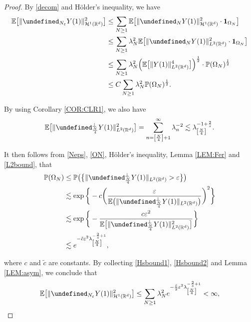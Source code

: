 \documentclass[%
11pt,  reqno]{amsart}
\theoremstyle{remarkstyle}
\newcommand{\1}{\hspace{0.2mm}\text{I}\hspace{0.2mm}}
\newcommand{\noi}{\noindent}
\newcommand{\R}{\mathbb{R}}
\let\P= \undefined
\newcommand{\P}{\mathbf{P}}
\newcommand{\E}{\mathbb{E}}
\newcommand{\eps}{\varepsilon}
\newcommand{\ld}{\lambda}
\renewcommand{\O}{\Omega}
\newcommand{\les}{\lesssim}
\newcommand{\ges}{\gtrsim}
\newcommand{\ind}{\mathbf 1}
\renewcommand{\H}{\mathcal{H}}
\newcommand{\PP}{\mathbb{P}}
\numberwithin{equation}{section}
\numberwithin{theorem}{section}
\begin{document}
\begin{proof}
		\noi
		By \eqref{decom} and H\"older's  inequality, 
		we have
		\begin{align}
			\label{Hsbound1}
			\begin{split}
				\E \big[ \| \P_{N_\eps} Y(1)\|_{\H^1 (\R^d)}^2 \big]  
				& \le \sum_{N\ge 1} \E  \big[ \| \P_{N} Y(1)\|_{\H^1 (\R^d)}^2 \cdot \ind_{\O_N} \big] \\
				& \le \sum_{N\ge 1} \ld_N^{2} \E \big[ \| \P_{ N} Y(1)\|_{L^2 (\R^d)}^2 \cdot \ind_{\O_N} \big]\\
				& \le \sum_{N\ge 1} \ld_N^{2} \Big( \E \big[ \| Y(1)\|_{L^2 (\R^d)}^4 \big] \Big)^{\frac12} \cdot \PP({\O_N})^{\frac12}
				\\
				& \le C \sum_{N\ge 1} \ld_N^{2}  \PP({\O_N})^{\frac12}.
			\end{split}
		\end{align}
		
		\noi
		By using Corollary \ref{COR:CLR1}, 
		we also  have 
		\begin{align}
			\label{L2bound}
			\E \big[ \| \P^\perp_{\frac{N}4} Y(1) \|_{L^2 (\R^d)}^2  \big] = \sum_{n = \left[\frac{N}4\right]+1}^\infty \ld_n^{-2} \les \ld_{\left[\frac{N}4\right]}^{-1 + \frac2s}.
		\end{align}
		
		\noi
		It then follows from \eqref{Neps}, \eqref{ON},
		H\"older's  inequality, Lemma \ref{LEM:Fer}
		and \eqref{L2bound}, that
		\begin{align}
			\label{Hsbound2}
			\begin{split}
				\PP(\O_N) & \le \PP\big( \big\{ \| \P^\perp_{\frac{N}4} Y(1) \|_{L^2(\R^d)} > \eps \big\} \big) \\
				& \les \exp \bigg\{-c \bigg( \frac{\eps}{\E \big( \| \P^\perp_{\frac{N}4} Y(1) \|_{L^{2} (\R^d)}  \big) }\bigg)^2 \bigg\} \\
				& \les \exp \bigg\{- \frac{c \eps^2}{\E \big[ \| \P^\perp_{\frac{N}4} Y(1) \|_{L^{2} (\R^d)}^2  \big] } \bigg\} \\
				& \les e^{-\tilde c \eps^2 \ld_{\left[\frac{N}4\right]}^{-\frac2s + 1}},
			\end{split}
		\end{align}
		
		\noi
		where $c$ and $\tilde c$ are constants.
		By collecting \eqref{Hsbound1}, \eqref{Hsbound2} and Lemma \ref{LEM:asym},
		we conclude that
		\begin{align*}
			\begin{split}
				\E \big[ \| \P_{N_\eps} Y(1)\|_{\H^1 (\R^d)}^2 \big]  
				\le  \sum_{N\ge 1} \ld_N^{2}  e^{- \frac{\tilde c}2 \eps^2 \ld_{\left[\frac{N}4\right]}^{-\frac2s +1}} < \infty,
			\end{split}
		\end{align*}
		

\end{proof}
\end{document}

